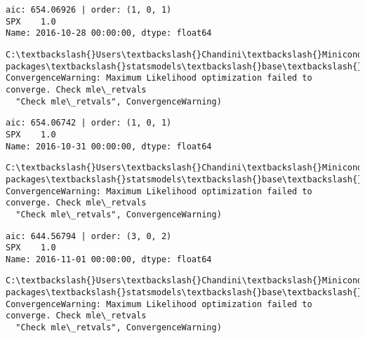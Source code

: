 \documentclass[11pt]{article}
\begin{document}
    \begin{Verbatim}[commandchars=\\\{\}]
aic: 654.06926 | order: (1, 0, 1)
SPX    1.0
Name: 2016-10-28 00:00:00, dtype: float64

    \end{Verbatim}

    \begin{Verbatim}[commandchars=\\\{\}]
C:\textbackslash{}Users\textbackslash{}Chandini\textbackslash{}Miniconda3\textbackslash{}envs\textbackslash{}auquan\textbackslash{}lib\textbackslash{}site-packages\textbackslash{}statsmodels\textbackslash{}base\textbackslash{}model.py:496: ConvergenceWarning: Maximum Likelihood optimization failed to converge. Check mle\_retvals
  "Check mle\_retvals", ConvergenceWarning)

    \end{Verbatim}

    \begin{Verbatim}[commandchars=\\\{\}]
aic: 654.06742 | order: (1, 0, 1)
SPX    1.0
Name: 2016-10-31 00:00:00, dtype: float64

    \end{Verbatim}

    \begin{Verbatim}[commandchars=\\\{\}]
C:\textbackslash{}Users\textbackslash{}Chandini\textbackslash{}Miniconda3\textbackslash{}envs\textbackslash{}auquan\textbackslash{}lib\textbackslash{}site-packages\textbackslash{}statsmodels\textbackslash{}base\textbackslash{}model.py:496: ConvergenceWarning: Maximum Likelihood optimization failed to converge. Check mle\_retvals
  "Check mle\_retvals", ConvergenceWarning)

    \end{Verbatim}

    \begin{Verbatim}[commandchars=\\\{\}]
aic: 644.56794 | order: (3, 0, 2)
SPX    1.0
Name: 2016-11-01 00:00:00, dtype: float64

    \end{Verbatim}

    \begin{Verbatim}[commandchars=\\\{\}]
C:\textbackslash{}Users\textbackslash{}Chandini\textbackslash{}Miniconda3\textbackslash{}envs\textbackslash{}auquan\textbackslash{}lib\textbackslash{}site-packages\textbackslash{}statsmodels\textbackslash{}base\textbackslash{}model.py:496: ConvergenceWarning: Maximum Likelihood optimization failed to converge. Check mle\_retvals
  "Check mle\_retvals", ConvergenceWarning)

    \end{Verbatim}
\end{document}
